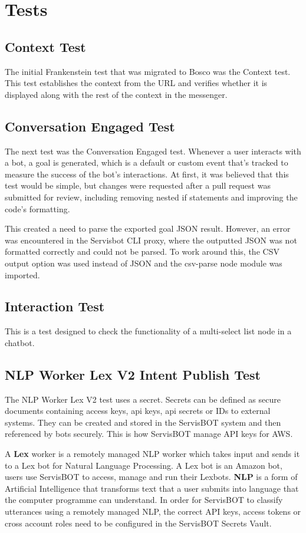 \documentclass[12pt,a4paper,titlepage]{report}
\begin{document}
\section{Tests}
\subsection{Context Test}
The initial Frankenstein test that was migrated to Bosco was the Context test. 
This test establishes the context from the URL and verifies whether it is displayed along with the rest of the context in the messenger. 

\subsection{Conversation Engaged Test}
The next test was the Conversation Engaged test. Whenever a user interacts with a bot, a goal is generated, which is a default or custom event that's tracked to measure the success of the bot's interactions.
At first, it was believed that this test would be simple, but changes were requested after a pull request was submitted for review, including removing nested if statements and improving the code's formatting.

This created a need to parse the exported goal JSON result. However, an error was encountered in the Servisbot CLI proxy, where the outputted JSON was not formatted correctly and could not be parsed. 
To work around this, the CSV output option was used instead of JSON and the csv-parse node module was imported.

\subsection{Interaction Test}
This is a test designed to check the functionality of a multi-select list node in a chatbot.

\subsection{NLP Worker Lex V2 Intent Publish Test}
The NLP Worker Lex V2 test uses a secret. Secrets can be defined as secure documents containing access keys, api keys, api secrets or IDs to external systems. 
They can be created and stored in the ServisBOT system and then referenced by bots securely. 
This is how ServisBOT manage API keys for AWS\@.

A \textbf{Lex} worker is a remotely managed NLP worker which takes input and sends it to a Lex bot for Natural Language Processing. 
A Lex bot is an Amazon bot, users use ServisBOT to access, manage and run their Lexbots. 
\textbf{NLP} is a form of Artificial Intelligence that transforms text that a user submits into language that the computer programme can understand. 
In order for ServisBOT to classify utterances using a remotely managed NLP, the correct API keys, access tokens or cross account roles need to be configured in the ServisBOT Secrets Vault.
\end{document}
